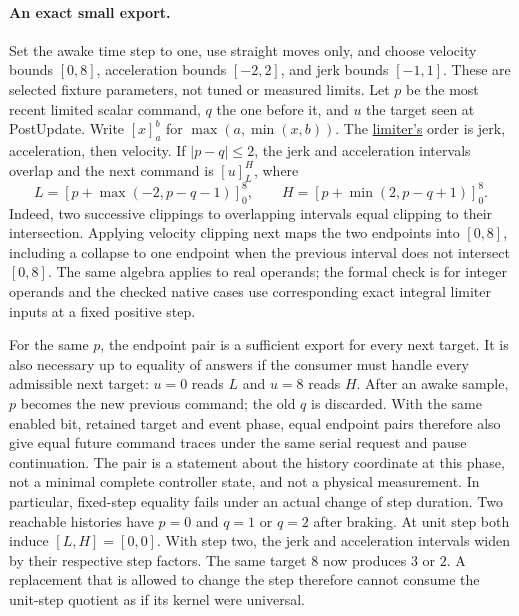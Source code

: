 \documentclass{article}
\begin{document}
\paragraph{An exact small export.}
Set the awake time step to one, use straight moves only, and choose
velocity bounds $[0,8]$, acceleration bounds $[-2,2]$, and jerk
bounds $[-1,1]$. These are selected fixture parameters, not tuned or
measured limits. Let $p$ be the most recent limited scalar command, $q$
the one before it, and $u$ the target seen at PostUpdate. Write $[x]_a^b$
for $\max(a,\min(x,b))$. The
\href{https://github.com/gazebosim/gz-math/blob/4ca6553b3ee6cae6696e8abe3aa70ca163274de4/src/SpeedLimiter.cc}{limiter's}
order is jerk, acceleration, then velocity. If $|p-q|\le2$, the jerk and
acceleration intervals overlap and the next command is $[u]_L^H$, where
\[
L=[p+\max(-2,p-q-1)]_0^8,\qquad
H=[p+\min(2,p-q+1)]_0^8.
\]
Indeed, two successive clippings to overlapping intervals equal clipping
to their intersection. Applying velocity clipping next maps the two
endpoints into $[0,8]$, including a collapse to one endpoint when the
previous interval does not intersect $[0,8]$. The same algebra applies to
real operands; the formal check is for integer operands and the checked
native cases use corresponding exact integral limiter inputs at a fixed
positive step.

For the same $p$, the endpoint pair is a sufficient export for every
next target. It is also necessary up to equality of answers if the
consumer must handle every admissible next target: $u=0$ reads $L$
and $u=8$ reads $H$. After an awake sample, $p$ becomes the new
previous command; the old $q$ is discarded. With the same enabled bit,
retained target and event phase, equal endpoint pairs therefore also
give equal future command traces under the same serial request and
pause continuation. The pair is a statement about the history
coordinate at this phase, not a minimal complete controller state,
and not a physical measurement. In particular, fixed-step equality
fails under an actual change of step duration. Two reachable histories
have $p=0$ and $q=1$ or $q=2$ after braking. At unit step both induce
$[L,H]=[0,0]$. With step two, the jerk and acceleration intervals widen
by their respective step factors. The same target $8$ now produces $3$
or $2$. A replacement that is allowed to change the step therefore
cannot consume the unit-step quotient as if its kernel were universal.
\end{document}

